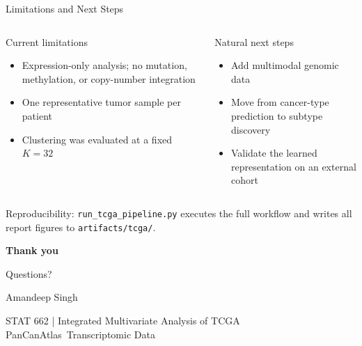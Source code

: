 \documentclass[aspectratio=169,10pt]{beamer}
\newcommand{\tcga}{TCGA PanCanAtlas}
\begin{document}
\begin{frame}{Limitations and Next Steps}
  \begin{columns}[T,onlytextwidth]
      \begin{block}{Current limitations}
        \footnotesize
        \begin{itemize}
          \item Expression-only analysis; no mutation, methylation, or copy-number integration
          \item One representative tumor sample per patient
          \item Clustering was evaluated at a fixed $K=32$
        \end{itemize}
      \end{block}
      \begin{block}{Natural next steps}
        \footnotesize
        \begin{itemize}
          \item Add multimodal genomic data
          \item Move from cancer-type prediction to subtype discovery
          \item Validate the learned representation on an external cohort
        \end{itemize}
      \end{block}
    \end{columns}
    \vspace{0.1cm}
    {\footnotesize\color{DeckSoft}Reproducibility: \texttt{run\_tcga\_pipeline.py} executes the full workflow and writes all report figures to \texttt{artifacts/tcga/}.\par}
\end{frame}

\begin{frame}[plain]
  \vfill
  \centering
  {\Huge\bfseries\color{DeckInk}Thank you\par}
  \vspace{0.35cm}
  {\Large\color{DeckSoft}Questions?\par}
  \vspace{0.8cm}
  {\large\color{DeckGreen}Amandeep Singh\par}
  \vspace{0.15cm}
  {\small\color{DeckSoft}STAT 662 | Integrated Multivariate Analysis of \tcga\ Transcriptomic Data\par}
  \vfill
\end{frame}
\end{document}
